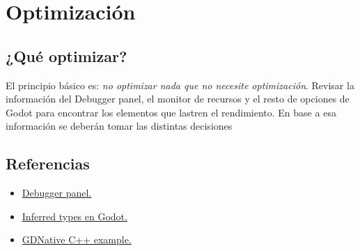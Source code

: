 
\section{Optimización}\label{optimizacion:optimizacion}



\subsection{¿Qué optimizar?}
El principio básico es: \emph{no optimizar nada que no necesite optimización}.
Revisar la información del Debugger panel, el monitor de recursos y el resto de opciones de Godot para encontrar los elementos que lastren el rendimiento. En base a esa información se deberán tomar las distintas decisiones 

\subsection{Referencias}
\begin{itemize}
\item \href{https://docs.godotengine.org/en/stable/tutorials/debug/debugger_panel.html}{Debugger panel.}
\item \href{https://docs.godotengine.org/en/stable/getting_started/scripting/gdscript/gdscript_styleguide.html#inferred-types}{Inferred types en Godot.}
\item \href{https://docs.godotengine.org/en/stable/tutorials/plugins/gdnative/gdnative-cpp-example.html}{GDNative C++ example.}
\end{itemize}
